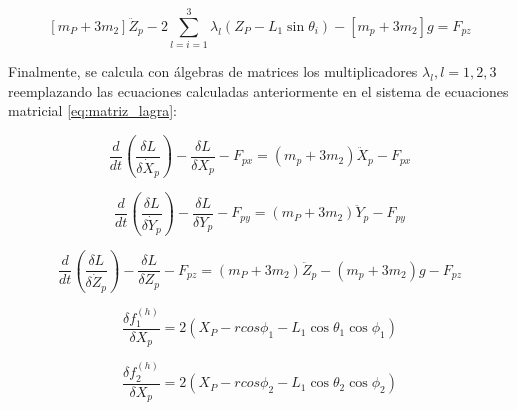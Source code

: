             \begin{equation}
             \left[ m_{P}+3m_{2} \right] \ddot{Z}_{p}-2 \sum _{l=i=1}^{3} \lambda _{l} \left( Z_{P}-L_{1}\sin  \theta _{i} \right) - \left[ m_{p}+3m_{2} \right] g=F_{pz} 
            \end{equation}
            
            Finalmente, se calcula con álgebras de matrices los multiplicadores $\lambda_l, l=1,2,3$ reemplazando las ecuaciones calculadas anteriormente en el sistema de ecuaciones matricial \ref{eq:matriz_lagra}: 

            \begin{FlushLeft}
             \[ \frac{d}{dt} \left( \frac{ \delta L}{ \delta \dot{X}_{p}} \right) -\frac{ \delta L}{ \delta X_{p}}-F_{px}= \left( m_{p}+3m_{2} \right) \ddot{X}_{p}-F_{px} \] 
            \end{FlushLeft}\par
            
            \begin{FlushLeft}
             \[ \frac{d}{dt} \left( \frac{ \delta L}{ \delta \dot{Y}_{p}} \right) -\frac{ \delta L}{ \delta Y_{p}}-F_{py}= \left( m_{P}+3m_{2} \right) \ddot{Y}_{p}-F_{py} \] 
            \end{FlushLeft}\par
            
            \begin{FlushLeft}
             \[ \frac{d}{dt} \left( \frac{ \delta L}{ \delta \dot{Z}_{p}} \right) -\frac{ \delta L}{ \delta Z_{p}}-F_{pz}= \left( m_{P}+3m_{2} \right) \ddot{Z}_{p}- \left( m_{p}+3m_{2} \right) g-F_{pz} \] 
            \end{FlushLeft}\par
            
            \begin{FlushLeft}
             \[ \frac{ \delta f_{1}^{ \left( h \right) }}{ \delta X_{p}}=2 \left( X_{P}- rcos \phi _{1}-L_{1}\cos  \theta _{1}\cos  \phi _{1} \right)  \] 
            \end{FlushLeft}\par
            
            \begin{FlushLeft}
             \[ \frac{ \delta f_{2}^{ \left( h \right) }}{ \delta X_{p}}=2 \left( X_{P}- rcos \phi _{2}-L_{1}\cos  \theta _{2}\cos  \phi _{2} \right)  \] 
            \end{FlushLeft}\par
            
